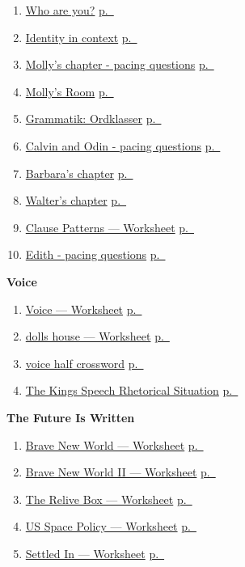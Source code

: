 \documentclass[11pt,a4paper,oneside]{book}
\newcommand{\tasktitle}[1]{{\color{blue}\bfseries #1}\par\smallskip}
\begin{document}
\begin{enumerate}
\item \hyperref[worksheet-1]{Who are you?} \hfill \hyperref[worksheet-1]{p.~\pageref*{worksheet-1}}
\item \hyperref[worksheet-2]{Identity in context} \hfill \hyperref[worksheet-2]{p.~\pageref*{worksheet-2}}
\item \hyperref[worksheet-3]{Molly's chapter - pacing questions} \hfill \hyperref[worksheet-3]{p.~\pageref*{worksheet-3}}
\item \hyperref[worksheet-4]{Molly's Room} \hfill \hyperref[worksheet-4]{p.~\pageref*{worksheet-4}}
\item \hyperref[worksheet-5]{Grammatik: Ordklasser} \hfill \hyperref[worksheet-5]{p.~\pageref*{worksheet-5}}
\item \hyperref[worksheet-6]{Calvin and Odin - pacing questions} \hfill \hyperref[worksheet-6]{p.~\pageref*{worksheet-6}}
\item \hyperref[worksheet-7]{Barbara's chapter} \hfill \hyperref[worksheet-7]{p.~\pageref*{worksheet-7}}
\item \hyperref[worksheet-8]{Walter's chapter} \hfill \hyperref[worksheet-8]{p.~\pageref*{worksheet-8}}
\item \hyperref[worksheet-9]{Clause Patterns — Worksheet} \hfill \hyperref[worksheet-9]{p.~\pageref*{worksheet-9}}
\item \hyperref[worksheet-10]{Edith - pacing questions} \hfill \hyperref[worksheet-10]{p.~\pageref*{worksheet-10}}
\end{enumerate}\tasktitle{Voice}\begin{enumerate}
\item \hyperref[worksheet-11]{Voice — Worksheet} \hfill \hyperref[worksheet-11]{p.~\pageref*{worksheet-11}}
\item \hyperref[worksheet-12]{dolls house — Worksheet} \hfill \hyperref[worksheet-12]{p.~\pageref*{worksheet-12}}
\item \hyperref[worksheet-13]{voice half crossword} \hfill \hyperref[worksheet-13]{p.~\pageref*{worksheet-13}}
\item \hyperref[worksheet-14]{The Kings Speech Rhetorical Situation} \hfill \hyperref[worksheet-14]{p.~\pageref*{worksheet-14}}
\end{enumerate}\tasktitle{The Future Is Written}\begin{enumerate}
\item \hyperref[worksheet-15]{Brave New World — Worksheet} \hfill \hyperref[worksheet-15]{p.~\pageref*{worksheet-15}}
\item \hyperref[worksheet-16]{Brave New World II — Worksheet} \hfill \hyperref[worksheet-16]{p.~\pageref*{worksheet-16}}
\item \hyperref[worksheet-17]{The Relive Box — Worksheet} \hfill \hyperref[worksheet-17]{p.~\pageref*{worksheet-17}}
\item \hyperref[worksheet-18]{US Space Policy — Worksheet} \hfill \hyperref[worksheet-18]{p.~\pageref*{worksheet-18}}
\item \hyperref[worksheet-19]{Settled In — Worksheet} \hfill \hyperref[worksheet-19]{p.~\pageref*{worksheet-19}}
\end{enumerate}
\end{document}
